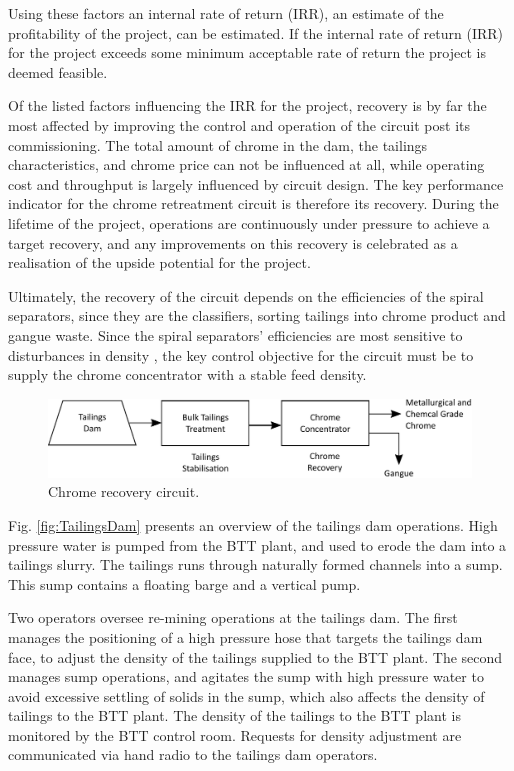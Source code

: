 \documentclass[preprint,authoryear,12pt]{elsarticle}
\begin{document}
Using these factors an internal rate of return (IRR), an estimate of the profitability of the project, can be estimated.  If the internal rate of return (IRR) for the project exceeds some minimum acceptable rate of return the project is deemed feasible.

Of the listed factors influencing the IRR for the project, recovery is by far the most affected by improving the control and operation of the circuit post its commissioning. The total amount of chrome in the dam, the tailings characteristics, and chrome price can not be influenced at all, while operating cost and throughput is largely influenced by circuit design. The key performance indicator for the chrome retreatment circuit is therefore its recovery. During the lifetime of the project, operations are continuously under pressure to achieve a target recovery, and any improvements on this recovery is celebrated as a realisation of the upside potential for the project.

Ultimately, the recovery of the circuit depends on the efficiencies of the spiral separators, since they are the classifiers, sorting tailings into chrome product and gangue waste. Since the spiral separators' efficiencies are most sensitive to disturbances in density \citep{HollandBatt1982}, the key control objective for the circuit must be to supply the chrome concentrator with a stable feed density.

\begin{figure}[h!]
	\centering
	\includegraphics[width=5.2in]{ChromeRecoveryFlowsheet.pdf}
	\caption{Chrome recovery circuit.}
	\label{fig:ChromeRecoveryFlowsheet}
\end{figure}
Fig. \ref{fig:TailingsDam} presents an overview of the tailings dam operations. High pressure water is pumped from the BTT plant, and used to erode the dam into a tailings slurry. The tailings runs through naturally formed channels into a sump. This sump contains a floating barge and a vertical pump. 

Two operators oversee re-mining operations at the tailings dam. The first manages the positioning of a high pressure hose that targets the tailings dam face, to adjust the density of the tailings supplied to the BTT plant. The second manages sump operations, and agitates the sump with high pressure water to avoid excessive settling of solids in the sump, which also affects the density of tailings to the BTT plant. The density of the tailings to the BTT plant is monitored by the BTT control room. Requests for density adjustment are communicated via hand radio to the tailings dam operators.
\end{document}
